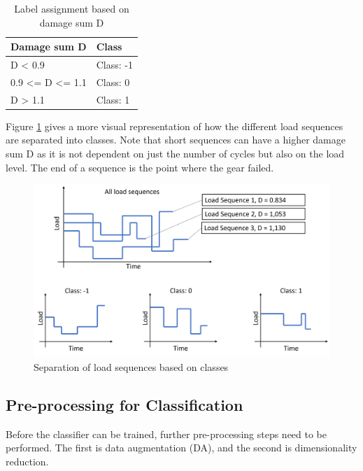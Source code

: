 \begin{table}
	\begin{center}
		\begin{tabular}{|| l | l ||}
			\hline
			\rule{0pt}{2ex}Damage sum D & Class\\
			\hline
			\hline
			\rule{0pt}{2ex}D < 0.9 & Class: -1\\\hline
			0.9 <= D <= 1.1 & Class:  0\\	\hline
			D > 1.1 & Class:  1\\\hline
			\hline
		\end{tabular}
		\caption{Label assignment based on damage sum D}
		\label{DamageClass}
	\end{center}
	\vspace{-4mm}
\end{table}


Figure \ref{fig:SBC1} gives a more visual representation of how the different load sequences are separated into classes. Note that short sequences can have a higher damage sum D as it is not dependent on just the number of cycles but also on the load level. The end of a sequence is the point where the gear failed. 

\begin{figure}[H]
	\centering
	\includegraphics[width=0.9\linewidth]{IMGs/SBC1.png}
	\caption{Separation of load sequences based on classes}
	\label{fig:SBC1}
\end{figure}

\subsection{Pre-processing for Classification}\label{prep_class}
Before the classifier can be trained, further pre-processing steps need to be performed. The first is data augmentation (DA), and the second is dimensionality reduction. 


